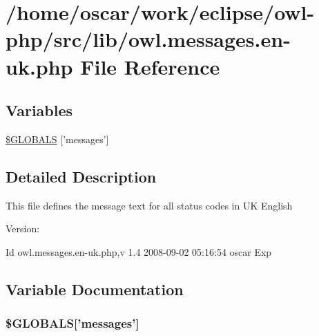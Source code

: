 \hypertarget{owl_8messages_8en-uk_8php}{
\section{/home/oscar/work/eclipse/owl-php/src/lib/owl.messages.en-uk.php File Reference}
\label{owl_8messages_8en-uk_8php}
}
\subsection*{Variables}
\begin{CompactItemize}
\item 
\hyperlink{owl_8messages_8en-uk_8php_65f2996116eed36e9ab25f254a470259}{\$GLOBALS} \mbox{[}'messages'\mbox{]}
\end{CompactItemize}


\subsection{Detailed Description}
This file defines the message text for all status codes in UK English \begin{Desc}
\item[Version:]\end{Desc}
\begin{Desc}
\item[Id]owl.messages.en-uk.php,v 1.4 2008-09-02 05:16:54 oscar Exp \end{Desc}


\subsection{Variable Documentation}
\hypertarget{owl_8messages_8en-uk_8php_65f2996116eed36e9ab25f254a470259}{
\subsubsection{\setlength{\rightskip}{0pt plus 5cm}\$GLOBALS\mbox{[}'messages'\mbox{]}}}
\label{owl_8messages_8en-uk_8php_65f2996116eed36e9ab25f254a470259}



